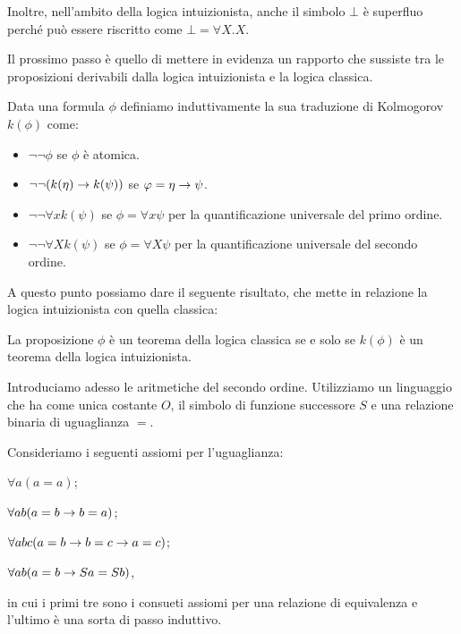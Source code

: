 \documentclass[]{marticle}
\begin{document}
Inoltre, nell'ambito della logica intuizionista, anche il simbolo $\bot$ \`e
superfluo perch\'e pu\`o essere riscritto come $\bot = \forall X.X$.


Il prossimo passo \`e quello di mettere in evidenza un rapporto che sussiste tra
le proposizioni derivabili dalla logica intuizionista e la logica classica.
\begin{block}[Definizione]
    Data una formula $\phi$ definiamo induttivamente la sua traduzione di
    Kolmogorov $k(\phi)$ come:
    \begin{itemize}
        \item $\lnot\lnot \phi$ se $\phi$ \`e atomica.
        \item $\lnot\lnot(k(\eta)\rightarrow k(\psi))$ se $\varphi=\eta\rightarrow\psi$.
        \item $\lnot\lnot \forall x k(\psi)$ se $\phi = \forall x \psi$ per la
            quantificazione universale del primo ordine.
        \item $\lnot\lnot \forall X k(\psi)$ se $\phi = \forall X \psi$ per la
            quantificazione universale del secondo ordine.
    \end{itemize}
\end{block}

A questo punto possiamo dare il seguente risultato, che mette in relazione la
logica intuizionista con quella classica:
\begin{block}[Proposizione]
    La proposizione $\phi$ \`e un teorema della logica classica se e solo se
    $k(\phi)$ \`e un teorema della logica intuizionista.
\end{block}

Introduciamo adesso le aritmetiche del secondo ordine. Utilizziamo un linguaggio
che ha come unica costante $O$, il simbolo di funzione successore $S$ e una
relazione binaria di uguaglianza $=$.

Consideriamo i seguenti assiomi per l'uguaglianza:
\begin{nlist}[U1]
    \item $\forall a (a=a)$;
    \item $\forall ab (a=b\rightarrow b=a)$;
    \item $\forall abc (a=b \rightarrow b=c \rightarrow a=c)$;
    \item $\forall ab(a=b \rightarrow Sa = Sb)$,
\end{nlist}
in cui i primi tre sono i consueti assiomi per una relazione di equivalenza e
l'ultimo \`e una sorta di passo induttivo.
\end{document}
